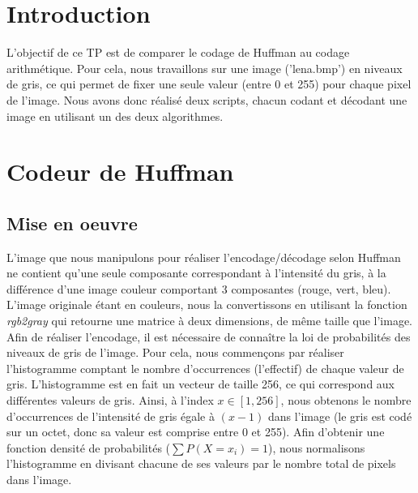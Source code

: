 \documentclass[a4paper, 12pt]{article}
\begin{document}






\clearpage

\section{Introduction}
L'objectif de ce TP est de comparer le codage de Huffman au codage arithmétique. Pour cela, nous travaillons sur une image ('lena.bmp') en niveaux de gris, ce qui permet de fixer une seule valeur (entre 0 et 255) pour chaque pixel de l'image. Nous avons donc réalisé deux scripts, chacun codant et décodant une image en utilisant un des deux algorithmes.

\section{Codeur de Huffman}

\subsection{Mise en oeuvre}

L'image que nous manipulons pour réaliser l'encodage/décodage selon Huffman ne contient qu'une seule composante correspondant à l'intensité du gris, à la différence d'une image couleur comportant 3 composantes (rouge, vert, bleu). L'image originale étant en couleurs, nous la convertissons en utilisant la fonction \textit{rgb2gray} qui retourne une matrice à deux dimensions, de même taille que l'image.\\

Afin de réaliser l'encodage, il est nécessaire de connaître la loi de probabilités des niveaux de gris de l'image. Pour cela, nous commençons par réaliser l'histogramme comptant le nombre d'occurrences (l'effectif) de chaque valeur de gris. L'histogramme est en fait un vecteur de taille 256, ce qui correspond aux différentes valeurs de gris. Ainsi, à l'index $x\in[1, 256]$, nous obtenons le nombre d’occurrences de l'intensité de gris égale à $(x-1)$ dans l'image (le gris est codé sur un octet, donc sa valeur est comprise entre 0 et 255). Afin d'obtenir une fonction densité de probabilités ($\sum P(X=x_{i}) = 1$), nous normalisons l'histogramme en divisant chacune de ses valeurs par le nombre total de pixels dans l'image. \\ 
\end{document}
